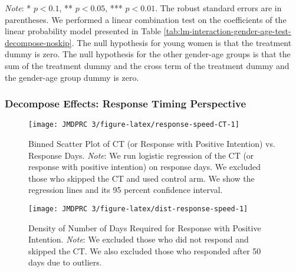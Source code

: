 \documentclass[12pt, a4paper]{article}
\begin{document}
\begin{table}[H]
\begin{threeparttable}
\begin{tabular}[t]{llcccccc}
\bottomrule
\end{tabular}
\begin{tablenotes}
\item \emph{Note}: * $p < 0.1$, ** $p < 0.05$, *** $p < 0.01$. The robust standard errors are in parentheses. We performed a linear combination test on the coefficients of the linear probability model presented in Table \ref{tab:lm-interaction-gender-age-test-decompose-noskip}. The null hypothesis for young women is that the treatment dummy is zero. The null hypothesis for the other gender-age groups is that the sum of the treatment dummy and the cross term of the treatment dummy and the gender-age group dummy is zero.
\end{tablenotes}
\end{threeparttable}
\end{table}

\hypertarget{decompose-effects-response-timing-perspective}{%
\subsubsection{Decompose Effects: Response Timing Perspective}\label{decompose-effects-response-timing-perspective}}

\begin{figure}[H]
\texttt{[image: JMDPRC~3/figure-latex/response-speed-CT-1]} \caption{Binned Scatter Plot of CT (or Response with Positive Intention) vs. Response Days. \newline \emph{Note}: We run logistic regression of the CT (or response with positive intention) on response days. We excluded those who skipped the CT and used control arm. We show the regression lines and its 95 percent confidence interval.}\label{fig:response-speed-CT}
\end{figure}

\begin{figure}[H]
\texttt{[image: JMDPRC~3/figure-latex/dist-response-speed-1]} \caption{Density of Number of Days Required for Response with Positive Intention. \newline \emph{Note}: We excluded those who did not respond and skipped the CT. We also excluded those who responded after 50 days due to outliers.}\label{fig:dist-response-speed}
\end{figure}
\end{document}
